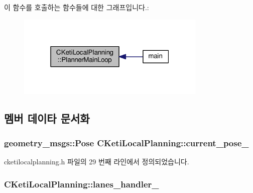 이 함수를 호출하는 함수들에 대한 그래프입니다.\+:\nopagebreak
\begin{figure}[H]
\begin{center}
\leavevmode
\includegraphics[width=256pt]{class_c_keti_local_planning_a3286318e734e7441036b43cec169978c_icgraph}
\end{center}
\end{figure}




\subsection{멤버 데이타 문서화}
\subsubsection[{\texorpdfstring{current\+\_\+pose\+\_\+}{current_pose_}}]{\setlength{\rightskip}{0pt plus 5cm}geometry\+\_\+msgs\+::\+Pose C\+Keti\+Local\+Planning\+::current\+\_\+pose\+\_\+\hspace{0.3cm}{\ttfamily [protected]}}\hypertarget{class_c_keti_local_planning_a4f4dcb94c250fb4d324b33f2fa42ffcb}{}\label{class_c_keti_local_planning_a4f4dcb94c250fb4d324b33f2fa42ffcb}


cketilocalplanning.\+h 파일의 29 번째 라인에서 정의되었습니다.

\subsubsection[{\texorpdfstring{lanes\+\_\+handler\+\_\+}{lanes_handler_}}]{ C\+Keti\+Local\+Planning\+::lanes\+\_\+handler\+\_\+\hspace{0.3cm}{\ttfamily [protected]}}\hypertarget{class_c_keti_local_planning_a6295120665288244397783d747cc60cf}{}\label{class_c_keti_local_planning_a6295120665288244397783d747cc60cf}


